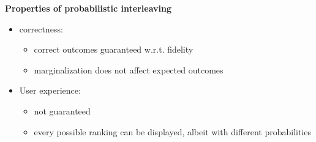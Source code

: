 \textbf{Properties of probabilistic interleaving}
\begin{itemize}
	\item correctness: 
	\begin{itemize}
		\item correct outcomes guaranteed w.r.t. fidelity
		\item marginalization does not affect expected outcomes
	\end{itemize}
	\item User experience:
	\begin{itemize}
		\item not guaranteed
		\item every possible ranking can be displayed, albeit with different probabilities
	\end{itemize}
\end{itemize}
